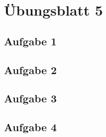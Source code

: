\documentclass[aspectratio=169,usepdftitle=true,11pt,ngerman,t]{beamer}
\subtitle{Tutorium 6}
\date{22. November 2024}
\begin{document}
\section[Übungsblatt 5]{Übungsblatt 5}

\subsection{Aufgabe 1}


\subsection{Aufgabe 2}


\subsection{Aufgabe 3}


\subsection{Aufgabe 4}

\end{document}
